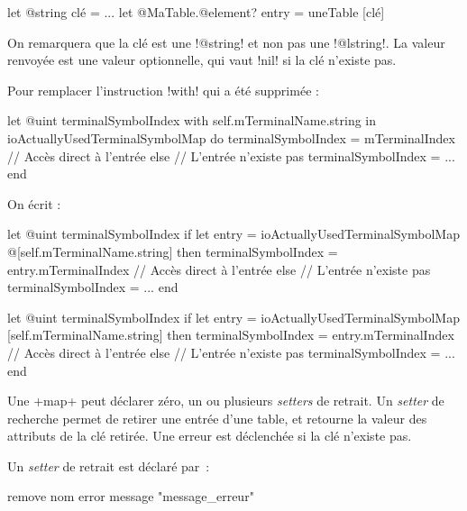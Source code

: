 \begin{galgas4}
let @string clé = ...
let @MaTable.@element? entry = uneTable [clé]
\end{galgas4}

On remarquera que la clé est une \ggsq!@string! et non pas une \ggsq!@lstring!. La valeur renvoyée est une valeur optionnelle, qui vaut \ggsq!nil! si la clé n'existe pas.

Pour remplacer l'instruction \ggsq!with! qui a été supprimée :

\begin{galgas3}
let @uint terminalSymbolIndex
with self.mTerminalName.string in ioActuallyUsedTerminalSymbolMap  do
  terminalSymbolIndex = mTerminalIndex // Accès direct à l'entrée
else // L'entrée n'existe pas
  terminalSymbolIndex = ...
end
\end{galgas3}

On écrit :

\begin{galgas3}
let @uint terminalSymbolIndex
if let entry = ioActuallyUsedTerminalSymbolMap @[self.mTerminalName.string] then
  terminalSymbolIndex = entry.mTerminalIndex // Accès direct à l'entrée
else // L'entrée n'existe pas
  terminalSymbolIndex = ...
end
\end{galgas3}


\begin{galgas4}
let @uint terminalSymbolIndex
if let entry = ioActuallyUsedTerminalSymbolMap [self.mTerminalName.string] then
  terminalSymbolIndex = entry.mTerminalIndex // Accès direct à l'entrée
else // L'entrée n'existe pas
  terminalSymbolIndex = ...
end
\end{galgas4}










Une \ggst+map+ peut déclarer zéro, un ou plusieurs \emph{setters} de retrait. Un \emph{setter} de recherche permet de retirer une entrée d'une table, et retourne la valeur des attributs de la clé retirée. Une erreur est déclenchée si la clé n'existe pas.


Un \emph{setter} de retrait est déclaré par~:

\begin{galgas3}
remove nom error message "message_erreur"
\end{galgas3}

\begin{galgas4}
\end{galgas4}

